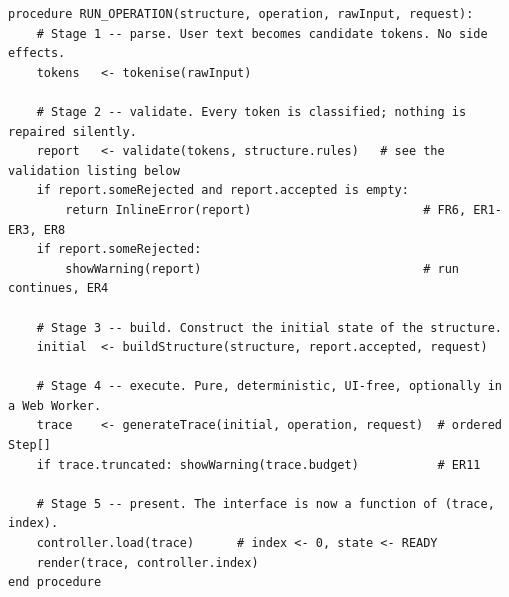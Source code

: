 \documentclass[11pt,a4paper]{article}
\newcommand{\ct}[1]{\texttt{#1}}
\begin{document}
\begin{lstlisting}[style=pseudo,caption={The generic pipeline. Every operation in the
application follows exactly these five stages; only \ct{generateTrace} differs between
operations.},label={lst:pipeline}]
procedure RUN_OPERATION(structure, operation, rawInput, request):
    # Stage 1 -- parse. User text becomes candidate tokens. No side effects.
    tokens   <- tokenise(rawInput)

    # Stage 2 -- validate. Every token is classified; nothing is repaired silently.
    report   <- validate(tokens, structure.rules)   # see the validation listing below
    if report.someRejected and report.accepted is empty:
        return InlineError(report)                        # FR6, ER1-ER3, ER8
    if report.someRejected:
        showWarning(report)                               # run continues, ER4

    # Stage 3 -- build. Construct the initial state of the structure.
    initial  <- buildStructure(structure, report.accepted, request)

    # Stage 4 -- execute. Pure, deterministic, UI-free, optionally in a Web Worker.
    trace    <- generateTrace(initial, operation, request)  # ordered Step[]
    if trace.truncated: showWarning(trace.budget)           # ER11

    # Stage 5 -- present. The interface is now a function of (trace, index).
    controller.load(trace)      # index <- 0, state <- READY
    render(trace, controller.index)
end procedure
\end{lstlisting}
\end{document}
